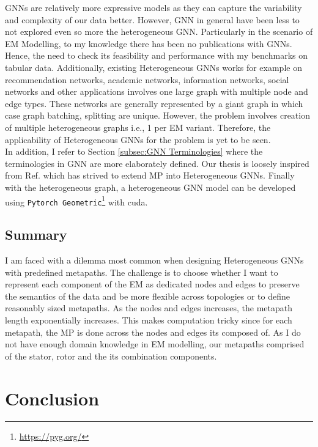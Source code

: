 \documentclass{report} %
\begin{document}
\ac{GNN}s are relatively more expressive models as they can capture the variability and complexity of our data better.
However, \ac{GNN} in general have been less to not explored even so more the heterogeneous \ac{GNN}.
Particularly in the scenario of \ac{EM} Modelling, to my knowledge there has been no publications with \ac{GNN}s.
Hence, the need to check its feasibility and performance with my benchmarks on tabular data.
Additionally, existing Heterogeneous \ac{GNN}s works for example on recommendation networks, academic networks, information networks, social networks and other applications 
involves one large graph with multiple node and edge types. These networks are generally represented by a giant graph in which case graph batching, splitting are unique. 
However, the problem involves creation of multiple heterogeneous graphs i.e., 1 per \ac{EM} variant. Therefore, the applicability of Heterogeneous \ac{GNN}s for the 
problem is yet to be seen.\\

In addition, I refer to Section \ref{subsec:GNN Terminologies} where the terminologies in \ac{GNN} are more elaborately defined.
Our thesis is loosely inspired from Ref. \cite{ML HGNN-2023} which has strived to extend \ac{MP} into Heterogeneous \ac{GNN}s.
Finally with the heterogeneous graph, a heterogeneous \ac{GNN} model can be developed using \texttt{Pytorch Geometric}\footnote{\url{https://pyg.org/}} with cuda.

\section{Summary}\label{sec:EM Heterogeneous GNN Discussion}
I am faced with a dilemma most common when designing Heterogeneous \ac{GNN}s with predefined metapaths.
The challenge is to choose whether I want to represent each component of the \ac{EM} as dedicated nodes and edges to preserve the semantics of the data and be more flexible 
across topologies or to define reasonably sized metapaths. As the nodes and edges increases, the metapath length exponentially increases.
This makes computation tricky since for each metapath, the \ac{MP} is done across the nodes and edges its composed of.
As I do not have enough domain knowledge in \ac{EM} modelling, our metapaths comprised of the stator, rotor and the its combination components.
\chapter{Conclusion}
\end{document}
